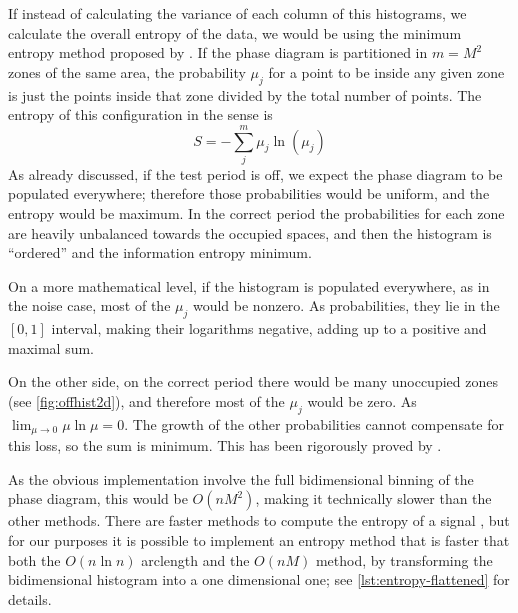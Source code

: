 	If instead of calculating the variance of each column of this histograms,
	we calculate the overall entropy of the data, we would be using the minimum entropy method proposed by \cite{Cincotta1995I}.
	If the phase diagram is partitioned in $m=M^2$ zones of the same area, 
	the probability $\mu_j$ for a point to be inside any given zone is just the points inside that zone divided by the total number of points.
	The entropy of this configuration in the \cite{Shannon1948} sense is 
	\begin{equation}
		S = - \sum_j^m \mu_j \ln(\mu_j) \label{eq:entropy}
	\end{equation}
	As already discussed, if the test period is off, we expect the phase diagram to be populated everywhere; 
	therefore those probabilities would be uniform, and the entropy would be maximum.
	In the correct period the probabilities for each zone are heavily unbalanced towards the occupied spaces,
	and then the histogram is \enquote{ordered} and the information entropy minimum.
	
	On a more mathematical level, if the histogram is populated everywhere, as in the noise case, 
	most of the $\mu_j$ would be nonzero. As probabilities, they lie in the $[0,1]$ interval, 
	making their logarithms negative, adding up to a positive and maximal sum.
	
	On the other side, on the correct period there would be many unoccupied zones (see \autoref{fig:offhist2d}), 
	and therefore most of the $\mu_j$ would be zero. As $\lim_{\mu\to0}\mu \ln \mu = 0$.
	The growth of the other probabilities cannot compensate for this loss, so the sum is minimum.	
	This has been rigorously proved by \cite{Cincotta1999II}.

	As the obvious implementation involve the full bidimensional binning of the phase diagram, 
	this would be $O(nM^2)$, making it technically slower than the other methods.
	There are faster methods to compute the entropy of a signal \citep{Cohen1985}, 
	but for our purposes it is possible to implement an entropy method that is faster that both 
	the $O(n\ln n)$ arclength and the $O(nM)$ method, by transforming the bidimensional histogram into a one dimensional one;
	see \autoref{lst:entropy-flattened} for details.
	
